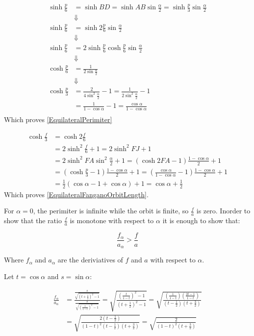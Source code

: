 \documentclass[a4paper,10pt]{article}
\begin{document}
\begin{align*}
\sinh{\frac{p}{6}}&=\sinh{BD}=\sinh{AB}\sin{\frac{\alpha}{2}}=\sinh{\frac{p}{3}}\sin{\frac{\alpha}{2}}\\
&\Downarrow\\
\sinh{\frac{p}{6}} &= \sinh{2\frac{p}{6}}\sin{\frac{\alpha}{2}}\\
&\Downarrow\\
\sinh{\frac{p}{6}} &= 2\sinh{\frac{p}{6}}\cosh{\frac{p}{6}}\sin{\frac{\alpha}{2}}\\
&\Downarrow\\
\cosh{\frac{p}{6}} &= \frac{1}{2\sin{\frac{\alpha}{2}}}\\
&\Downarrow\\
\cosh{\frac{p}{3}} &= \frac{2}{4\sin^2{\frac{\alpha}{2}}} - 1 = \frac{1}{2\sin^2{\frac{\alpha}{2}}} - 1 \\
&= \frac{1}{1-\cos{\alpha}} - 1 = \frac{\cos{\alpha}}{1-\cos{\alpha}} \\
\end{align*}
Which proves \eqref{EquilateralPerimiter}


\begin{align*}
\cosh{\frac{f}{3}}&=\cosh{2\frac{f}{6}}\\
&=2\sinh^2{\frac{f}{6}}+1=2\sinh^2{FJ}+1\\
&=2\sinh^2{FA}\sin^2{\frac{\alpha}{2}}+1 = \left(\cosh{2FA}-1\right)\frac{1-\cos{\alpha}}{2}+1\\
&=\left(\cosh{\frac{p}{3}}-1\right)\frac{1-\cos{\alpha}}{2}+1=\left(\frac{\cos{\alpha}}{1-\cos{\alpha}}-1\right)\frac{1-\cos{\alpha}}{2}+1\\
&=\frac{1}{2}\left(\cos{\alpha}-1+\cos{\alpha}\right)+1=\cos{\alpha}+\frac{1}{2}
\end{align*}
Which proves \eqref{EquilateralFanganoOrbitLength}.

For $\alpha=0$, the perimiter is infinite while the orbit is finite, so $\frac{f}{a}$ is zero.
Inorder to show that the ratio $\frac{f}{a}$ is monotone with respect to $\alpha$ it
is enough to show that:

\[
\frac{f_\alpha}{a_\alpha} > \frac{f}{a}
\]

Where $f_\alpha$ and $a_\alpha$ are the deriviatives of $f$ and $a$ with respect to $\alpha$.

Let $t=\cos{\alpha}$ and $s=\sin{\alpha}$:

\begin{align*}
\frac{f_\alpha}{a_\alpha} &= \frac{  \frac{s}{\sqrt{  \left(t+\frac{1}{2}\right)^2   - 1} }}
                                {  \frac{s}{\sqrt{  \left(  \frac{t}{1-t}  \right)^2   - 1} }}
= \sqrt{\frac{\left(  \frac{t}{1-t}  \right)^2   - 1}{  \left(t+\frac{1}{2}\right)^2   - 1 }}
= \sqrt{\frac{\left(  \frac{1}{1-t}  \right)\left(  \frac{2t-1}{1-t}  \right)}
              {  \left(t-\frac{1}{2}\right)\left(t+\frac{3}{2}\right) }}\\
&= \sqrt{\frac{2\left( t-\frac{1}{2}\right)}
              {  \left(1 - t\right)^2\left(t-\frac{1}{2}\right)\left(t+\frac{3}{2}\right) }}
= \sqrt{\frac{2}
              {  \left(1 - t\right)^2\left(t+\frac{3}{2}\right) }}\\
\end{align*}
\end{document}
